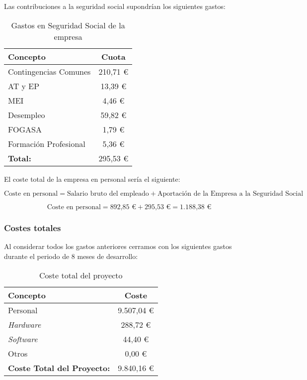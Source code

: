 Las contribuciones a la seguridad social supondrían los siguientes gastos:

\begin{table}[h!]
	\centering
	\begin{tabular}{| l | c |}
		\toprule
		\textbf{Concepto} & \textbf{Cuota} \\ \midrule
		Contingencias Comunes & 210,71 € \\
		AT y EP & 13,39 € \\
		MEI & 4,46 € \\
		Desempleo & 59,82 € \\
		FOGASA & 1,79 € \\
		Formación Profesional & 5,36 € \\
		\midrule
		\textbf{Total:} & 295,53 € \\
		\bottomrule
	\end{tabular}
	\caption{Gastos en Seguridad Social de la empresa}
	\label{SSempresagastos}
\end{table}


El coste total de la empresa en personal sería el siguiente:

\[
\text{Coste en personal} = \text{Salario bruto del empleado} + \text{Aportación de la Empresa a la Seguridad Social}
\]

\[
\text{Coste en personal} = \text{892,85 €} + \text{295,53 €} = \text{1.188,38 €}
\]

%
%

\subsubsection{Costes totales}
Al considerar todos los gastos anteriores cerramos con los siguientes gastos durante el periodo de 8 meses de desarrollo:

\begin{table}[h!]
	\centering
	\begin{tabular}{| l | c |}
		\hline
		\textbf{Concepto} & \textbf{Coste} \\ \hline
		Personal & 9.507,04 €\\
		\textit{Hardware} & 288,72  € \\
		\textit{Software} & 44,40 €\\
		Otros & 0,00 €\\
		
		\hline
		\textbf{Coste Total del Proyecto:} & 9.840,16 € \\
		\hline
	\end{tabular}
	\caption{Coste total del proyecto}
	\label{Costproject}
\end{table}

